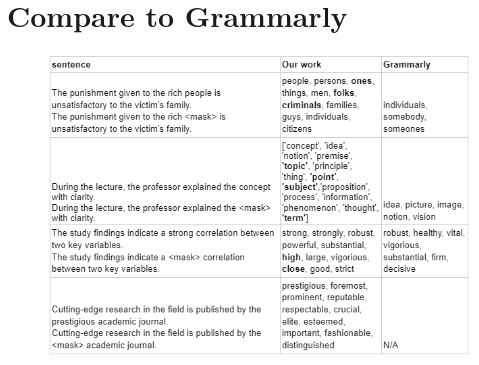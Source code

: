 \documentclass[12pt,oneside,openright,a4paper]{cpe-english-project}
\begin{document}
\section{Compare to Grammarly}
\begin{figure}[!h]\centering
\includegraphics[width=15cm]{./img/Appendix/Grammarly.png}
\end{figure}

\end{document}
